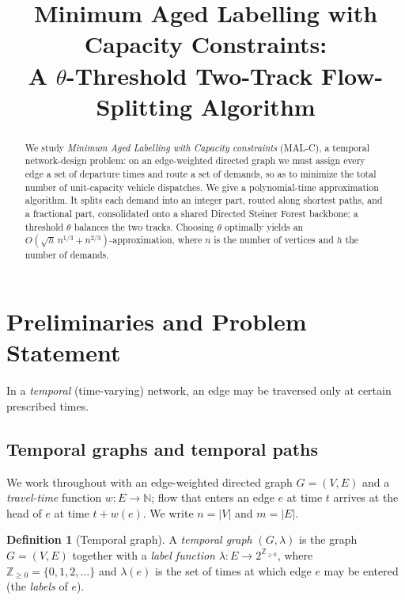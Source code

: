 \documentclass[11pt]{article}
\title{\bf Minimum Aged Labelling with Capacity Constraints:\\[2pt]
A $\theta$-Threshold Two-Track Flow-Splitting Algorithm}
\author{}
\date{}
\theoremstyle{definition}
\newtheorem{definition}{Definition}
\theoremstyle{remark}
\newcommand{\Zzero}{\mathbb{Z}_{\ge 0}}
\begin{document}
\maketitle

\begin{abstract}
We study \emph{Minimum Aged Labelling with Capacity constraints} (MAL-C), a temporal
network-design problem: on an edge-weighted directed graph we must assign every edge a set of
departure times and route a set of demands, so as to minimize the total number of unit-capacity
vehicle dispatches. We give a polynomial-time approximation algorithm. It splits each demand into an
integer part, routed along shortest paths, and a fractional part, consolidated onto a shared Directed
Steiner Forest backbone; a threshold $\theta$ balances the two tracks. Choosing $\theta$ optimally
yields an $O\!\left(\sqrt{h}\,n^{1/3}+n^{2/3}\right)$-approximation, where $n$ is the number of
vertices and $h$ the number of demands.
\end{abstract}

\section{Preliminaries and Problem Statement}\label{sec:prelim}

In a \emph{temporal} (time-varying) network, an edge may be traversed only at certain prescribed
times.

\subsection{Temporal graphs and temporal paths}\label{sec:temporal}

We work throughout with an edge-weighted directed graph $G=(V,E)$ and a \emph{travel-time} function
$w:E\to\mathbb{N}$; flow that enters an edge $e$ at time $t$ arrives at the head of $e$ at time
$t+w(e)$. We write $n=|V|$ and $m=|E|$.

\begin{definition}[Temporal graph]\label{def:tgraph}
A \emph{temporal graph} $(G,\lambda)$ is the graph $G=(V,E)$ together with a \emph{label function}
$\lambda:E\to 2^{\Zzero}$, where $\Zzero=\{0,1,2,\dots\}$ and $\lambda(e)$ is the set of times at which
edge $e$ may be entered (the \emph{labels} of $e$).
\end{definition}
\end{document}

